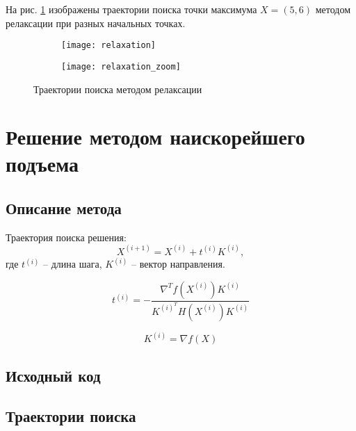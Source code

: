 На рис. \ref{fig:relaxation} изображены траектории поиска точки максимума $X = (5, 6)$ методом релаксации при разных начальных точках.
\begin{figure}[H]
\begin{center}
	\begin{subfigure}[b]{0.49\textwidth}
		\texttt{[image: relaxation]}
	\end{subfigure}
	\begin{subfigure}[b]{0.49\textwidth}
		\texttt{[image: relaxation\_zoom]}
	\end{subfigure}
	\caption{Траектории поиска методом релаксации}
	\label{fig:relaxation}
\end{center}
\end{figure}

\section{Решение методом наискорейшего подъема}

\subsection{Описание метода}

Траектория поиска решения:
\begin{equation*}
X^{(i+1)}  = X^{(i)} + t^{(i)} K^{(i)},
\end{equation*}
где $t^{(i)}$ -- длина шага, $K^{(i)}$ -- вектор направления.

\begin{equation*}
t^{(i)} = -\dfrac{\nabla^T f\left(X^{(i)}\right) K^{(i)}}{K^{(i)^T} H\left(X^{(i)}\right) K^{(i)}}
\end{equation*}

\begin{equation*}
K^{(i)} = \nabla f(X)
\end{equation*}

\subsection{Исходный код}



\subsection{Траектории поиска}

